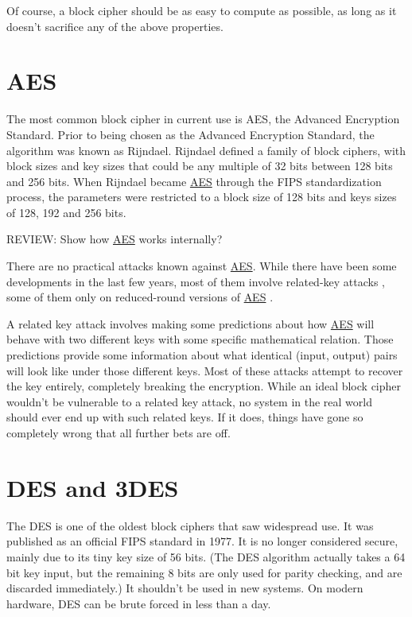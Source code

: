 \documentclass[11pt,ebook,table,dvipsnames]{memoir}
\begin{document}
Of course, a block cipher should be as easy to compute as possible,
as long as it doesn't sacrifice any of the above properties.
\section{\label{AES}AES}
\label{sec-2-2-2}

The most common block cipher in current use is \gls{AES}, the Advanced
Encryption Standard. Prior to being chosen as the Advanced Encryption
Standard, the algorithm was known as Rijndael. Rijndael defined a
family of block ciphers, with block sizes and key sizes that could be
any multiple of 32 bits between 128 bits and 256 bits.
\cite{daemen:aes} When Rijndael became \hyperref[AES]{AES} through the \gls{FIPS}
standardization process, the parameters were restricted to a block
size of 128 bits and keys sizes of 128, 192 and 256 bits.
\cite{fips:aes}

REVIEW: Show how \hyperref[AES]{AES} works internally?

There are no practical attacks known against \hyperref[AES]{AES}. While there have
been some developments in the last few years, most of them involve
related-key attacks \cite{cryptoeprint:2009:317}, some of them only on
reduced-round versions of \hyperref[AES]{AES} \cite{cryptoeprint:2009:374}.

A related key attack involves making some predictions about how \hyperref[AES]{AES}
will behave with two different keys with some specific mathematical
relation. Those predictions provide some information about what
identical (input, output) pairs will look like under those different
keys. Most of these attacks attempt to recover the key entirely,
completely breaking the encryption. While an ideal block cipher
wouldn't be vulnerable to a related key attack, no system in the real
world should ever end up with such related keys. If it does, things
have gone so completely wrong that all further bets are off.
\section{DES and 3DES}
\label{sec-2-2-3}

The \gls{DES} is one of the oldest block ciphers that saw widespread
use. It was published as an official \gls{FIPS} standard in 1977. It
is no longer considered secure, mainly due to its tiny key size of 56
bits. (The DES algorithm actually takes a 64 bit key input, but the
remaining 8 bits are only used for parity checking, and are discarded
immediately.) It shouldn't be used in new systems. On modern hardware,
DES can be brute forced in less than a day. \cite{sciengines:breakdes}
\end{document}
